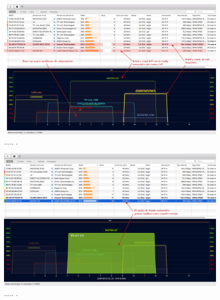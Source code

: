 \begin{landscape} %
\begin{figure}[htpb]
\centering 
\includegraphics[width=1.5\textwidth]{./Figures/wifi/01.png}
\caption{..... .}
\label{fig:test01}
\end{figure}
\end{landscape} %


\begin{landscape} %
\begin{figure}[htpb]
\centering 
\includegraphics[width=1.5\textwidth]{./Figures/wifi/02.png}
\caption{..... .}
\label{fig:test02}
\end{figure}
\end{landscape} %


